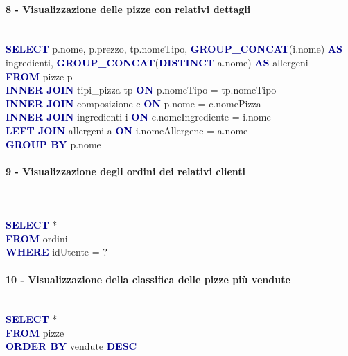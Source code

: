 \documentclass[a4paper,12pt, oneside]{article}
\begin{document}
\paragraph{8 - Visualizzazione delle pizze con relativi dettagli}
\hphantom{A}\\    %
\textcolor{darkBlue}{\textbf{SELECT}} p.nome, p.prezzo, tp.nomeTipo, \textcolor{darkBlue}{\textbf{GROUP\_CONCAT}}(i.nome) \textcolor{darkBlue}{\textbf{AS}} ingredienti, \textcolor{darkBlue}{\textbf{GROUP\_CONCAT}}(\textcolor{darkBlue}{\textbf{DISTINCT}} a.nome) \textcolor{darkBlue}{\textbf{AS}} allergeni
\\\textcolor{darkBlue}{\textbf{FROM}} pizze p
\\\textcolor{darkBlue}{\textbf{INNER JOIN}} tipi\_pizza tp \textcolor{darkBlue}{\textbf{ON}} p.nomeTipo = tp.nomeTipo
\\\textcolor{darkBlue}{\textbf{INNER JOIN}} composizione c \textcolor{darkBlue}{\textbf{ON}} p.nome = c.nomePizza
\\\textcolor{darkBlue}{\textbf{INNER JOIN}} ingredienti i \textcolor{darkBlue}{\textbf{ON}} c.nomeIngrediente = i.nome
\\\textcolor{darkBlue}{\textbf{LEFT JOIN}} allergeni a \textcolor{darkBlue}{\textbf{ON}} i.nomeAllergene = a.nome
\\\textcolor{darkBlue}{\textbf{GROUP BY}} p.nome

\paragraph{9 - Visualizzazione degli ordini dei relativi clienti}
\hphantom{A}\\    %
\\
\textcolor{darkBlue}{\textbf{SELECT}} *
\\\textcolor{darkBlue}{\textbf{FROM}} ordini
\\\textcolor{darkBlue}{\textbf{WHERE}} idUtente = ?

\paragraph{10 - Visualizzazione della classifica delle pizze più vendute}
\hphantom{A}\\    %
\textcolor{darkBlue}{\textbf{SELECT}} *
\\\textcolor{darkBlue}{\textbf{FROM}} pizze
\\\textcolor{darkBlue}{\textbf{ORDER BY}} vendute \textcolor{darkBlue}{\textbf{DESC}}
\end{document}

